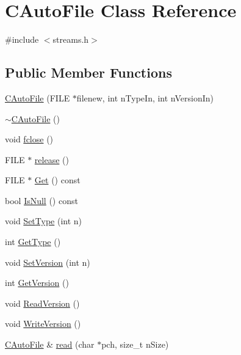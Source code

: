 \hypertarget{class_c_auto_file}{}\section{C\+Auto\+File Class Reference}
\label{class_c_auto_file}


{\ttfamily \#include $<$streams.\+h$>$}

\subsection*{Public Member Functions}
\begin{DoxyCompactItemize}
\item 
\mbox{\hyperlink{class_c_auto_file_a52613083aaeab4c9238c649ae471783f}{C\+Auto\+File}} (F\+I\+LE $\ast$filenew, int n\+Type\+In, int n\+Version\+In)
\item 
\mbox{\hyperlink{class_c_auto_file_ab1362f4cb52c819c25cff4598e0f28da}{$\sim$\+C\+Auto\+File}} ()
\item 
void \mbox{\hyperlink{class_c_auto_file_abcbafe943bfe392c09363078fa8a4e77}{fclose}} ()
\item 
F\+I\+LE $\ast$ \mbox{\hyperlink{class_c_auto_file_a25b51d94dc85c4140da0b15494ac9f8a}{release}} ()
\item 
F\+I\+LE $\ast$ \mbox{\hyperlink{class_c_auto_file_a2c1ad2d25562fea82a54bdef2793a0dd}{Get}} () const
\item 
bool \mbox{\hyperlink{class_c_auto_file_a7fd47268b6d85a89acafdb73559f8e78}{Is\+Null}} () const
\item 
void \mbox{\hyperlink{class_c_auto_file_ac1a3986f191fe81384f58fc5fa073820}{Set\+Type}} (int n)
\item 
int \mbox{\hyperlink{class_c_auto_file_a774f2aad2c462d4ff47125ceec2ebab0}{Get\+Type}} ()
\item 
void \mbox{\hyperlink{class_c_auto_file_a51f805bc470a95c9948250503b587aec}{Set\+Version}} (int n)
\item 
int \mbox{\hyperlink{class_c_auto_file_a976ab8e5477aedd3a531fc49b01153ce}{Get\+Version}} ()
\item 
void \mbox{\hyperlink{class_c_auto_file_a9511060b5c971cff532faeab60c7d88b}{Read\+Version}} ()
\item 
void \mbox{\hyperlink{class_c_auto_file_a23d6f22c3aff80be7665bfc5a77a01ff}{Write\+Version}} ()
\item 
\mbox{\hyperlink{class_c_auto_file}{C\+Auto\+File}} \& \mbox{\hyperlink{class_c_auto_file_a87e670f3dd03055264c05b25335babb4}{read}} (char $\ast$pch, size\+\_\+t n\+Size)

\end{DoxyCompactItemize}
